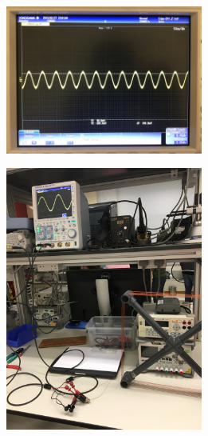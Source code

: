 \documentclass[journal]{IEEEtran}
\begin{document}
\begingroup
    \centering
    \includegraphics[width=245]{images/lab5_3.jpg}
    \label{fig:HPF}
\endgroup

\begingroup
    \centering
    \includegraphics[width=245]{images/lab5_2.jpg}
    \label{fig:HPF}
\endgroup
\end{document}
